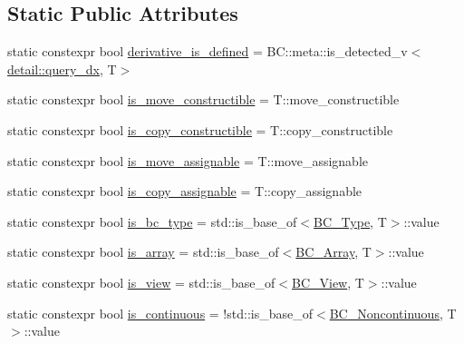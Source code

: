 \subsection*{Static Public Attributes}
\begin{DoxyCompactItemize}
\item 
static constexpr bool \hyperlink{structBC_1_1tensors_1_1exprs_1_1expression__traits_acbcd4e07a009c38b446e8c4d96d15b4e}{derivative\+\_\+is\+\_\+defined} = B\+C\+::meta\+::is\+\_\+detected\+\_\+v$<$\hyperlink{namespaceBC_1_1tensors_1_1exprs_1_1detail_afce786a08d3636682dba772cadb7d251}{detail\+::query\+\_\+dx}, T$>$
\item 
static constexpr bool \hyperlink{structBC_1_1tensors_1_1exprs_1_1expression__traits_aa9f262de79c02b4ee44c7cde0dbaa80f}{is\+\_\+move\+\_\+constructible} = T\+::move\+\_\+constructible
\item 
static constexpr bool \hyperlink{structBC_1_1tensors_1_1exprs_1_1expression__traits_a6ce7acf8f9730b988b165e980a04f414}{is\+\_\+copy\+\_\+constructible} = T\+::copy\+\_\+constructible
\item 
static constexpr bool \hyperlink{structBC_1_1tensors_1_1exprs_1_1expression__traits_afc39357c204a3ab34923e6d7ee713698}{is\+\_\+move\+\_\+assignable} = T\+::move\+\_\+assignable
\item 
static constexpr bool \hyperlink{structBC_1_1tensors_1_1exprs_1_1expression__traits_a8e3c18748968740ef7a8526950d692c9}{is\+\_\+copy\+\_\+assignable} = T\+::copy\+\_\+assignable
\item 
static constexpr bool \hyperlink{structBC_1_1tensors_1_1exprs_1_1expression__traits_a73033f70dcd6430ed05bb8fe843ed220}{is\+\_\+bc\+\_\+type} = std\+::is\+\_\+base\+\_\+of$<$\hyperlink{classBC_1_1tensors_1_1exprs_1_1BC__Type}{B\+C\+\_\+\+Type}, T$>$\+::value
\item 
static constexpr bool \hyperlink{structBC_1_1tensors_1_1exprs_1_1expression__traits_a8774f4aef36f7f53555b92560ad5b0d6}{is\+\_\+array} = std\+::is\+\_\+base\+\_\+of$<$\hyperlink{classBC_1_1tensors_1_1exprs_1_1BC__Array}{B\+C\+\_\+\+Array}, T$>$\+::value
\item 
static constexpr bool \hyperlink{structBC_1_1tensors_1_1exprs_1_1expression__traits_ac41debc0a82fa70128a31a3192610e5a}{is\+\_\+view} = std\+::is\+\_\+base\+\_\+of$<$\hyperlink{classBC_1_1tensors_1_1exprs_1_1BC__View}{B\+C\+\_\+\+View}, T$>$\+::value
\item 
static constexpr bool \hyperlink{structBC_1_1tensors_1_1exprs_1_1expression__traits_a25f42c4b0aacb8dbb3f7768f4190abdf}{is\+\_\+continuous} = !std\+::is\+\_\+base\+\_\+of$<$\hyperlink{classBC_1_1tensors_1_1exprs_1_1BC__Noncontinuous}{B\+C\+\_\+\+Noncontinuous}, T$>$\+::value

\end{DoxyCompactItemize}
